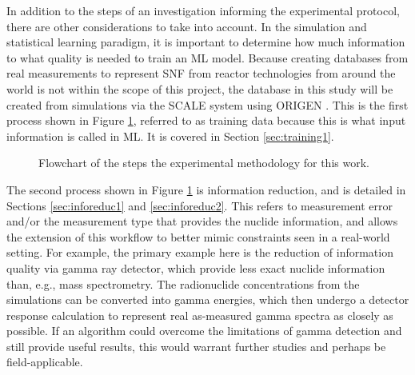 In addition to the steps of an investigation informing the experimental
protocol, there are other considerations to take into account. In the
simulation and statistical learning paradigm, it is important to determine how
much information to what quality is needed to train an \gls{ML} model. Because
creating databases from real measurements to represent \gls{SNF} from reactor
technologies from around the world is not within the scope of this project, the
database in this study will be created from simulations via the \gls{SCALE}
\cite{scale} system using \gls{ORIGEN} \cite{origen, origenarp}. This is the
first process shown in Figure \ref{fig:intromethod}, referred to as training
data because this is what input information is called in \gls{ML}. It is
covered in Section \ref{sec:training1}.

\begin{figure}[!hbt]
  \caption[Experimental methodology flowchart]
          {Flowchart of the steps the experimental methodology for this work.}
  \label{fig:intromethod}
\end{figure}

The second process shown in Figure \ref{fig:intromethod} is information
reduction, and is detailed in Sections \ref{sec:inforeduc1} and
\ref{sec:inforeduc2}.  This refers to measurement error and/or the measurement
type that provides the nuclide information, and allows the extension of this
workflow to better mimic constraints seen in a real-world setting.  For
example, the primary example here is the reduction of information quality via
gamma ray detector, which provide less exact nuclide information than, e.g.,
mass spectrometry.  The radionuclide concentrations from the simulations can be
converted into gamma energies, which then undergo a detector response
calculation to represent real as-measured gamma spectra as closely as possible.
If an algorithm could overcome the limitations of gamma detection and still
provide useful results, this would warrant further studies and perhaps be
field-applicable.

